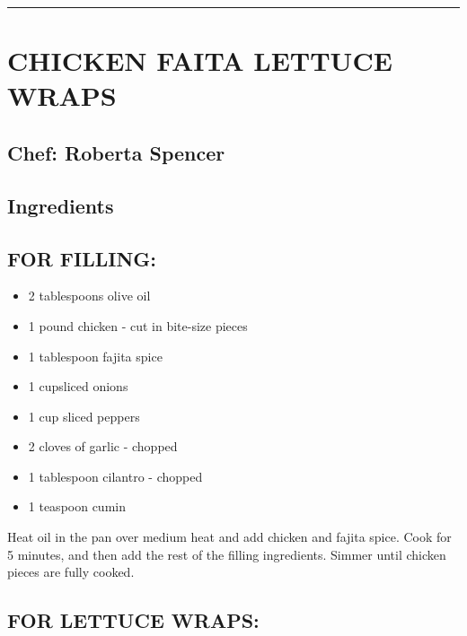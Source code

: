 \documentclass[
]{book}
\providecommand{\tightlist}{%
  \setlength{\itemsep}{0pt}\setlength{\parskip}{0pt}}
\begin{document}
\begin{center}\rule{0.5\linewidth}{0.5pt}\end{center}

\hypertarget{chicken-faita-lettuce-wraps}{%
\section*{CHICKEN FAITA LETTUCE WRAPS}\label{chicken-faita-lettuce-wraps}}


\hypertarget{chef-roberta-spencer-17}{%
\subsection*{Chef: Roberta Spencer}\label{chef-roberta-spencer-17}}


\hypertarget{ingredients-49}{%
\subsection*{Ingredients}\label{ingredients-49}}


\hypertarget{for-filling}{%
\subsection*{FOR FILLING:}\label{for-filling}}


\begin{itemize}
\tightlist
\item
  2 tablespoons olive oil
\item
  1 pound chicken - cut in bite-size pieces
\item
  1 tablespoon fajita spice
\item
  1 cupsliced onions
\item
  1 cup sliced peppers
\item
  2 cloves of garlic - chopped
\item
  1 tablespoon cilantro - chopped
\item
  1 teaspoon cumin
\end{itemize}

Heat oil in the pan over medium heat and add chicken and fajita spice. Cook for 5 minutes, and then
add the rest of the filling ingredients. Simmer until chicken pieces are fully cooked.

\hypertarget{for-lettuce-wraps}{%
\subsection*{FOR LETTUCE WRAPS:}\label{for-lettuce-wraps}}
\end{document}
